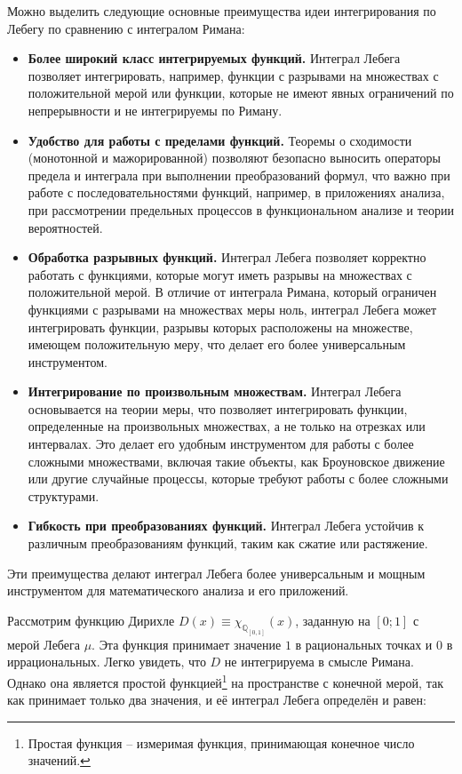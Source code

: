 \documentclass[a4paper,14pt]{extarticle}
\begin{document}
Можно выделить следующие основные преимущества идеи интегрирования по Лебегу по сравнению с интегралом Римана:

\begin{itemize}
    \item \textbf{Более широкий класс интегрируемых функций.} Интеграл Лебега позволяет интегрировать, например, функции с разрывами на множествах с положительной мерой или функции, которые не имеют явных ограничений по непрерывности и не интегрируемы по Риману.
    \item \textbf{Удобство для работы с пределами функций.} Теоремы о сходимости (монотонной и мажорированной) позволяют безопасно выносить операторы предела и интеграла при выполнении преобразований формул, что важно при работе с последовательностями функций, например, в приложениях анализа, при рассмотрении предельных процессов в функциональном анализе и теории вероятностей.
    \item \textbf{Обработка разрывных функций.} Интеграл Лебега позволяет корректно работать с функциями, которые могут иметь разрывы на множествах с положительной мерой. В отличие от интеграла Римана, который ограничен функциями с разрывами на множествах меры ноль, интеграл Лебега может интегрировать функции, разрывы которых расположены на множестве, имеющем положительную меру, что делает его более универсальным инструментом.
    \item \textbf{Интегрирование по произвольным множествам.} Интеграл Лебега основывается на теории меры, что позволяет интегрировать функции, определенные на произвольных множествах, а не только на отрезках или интервалах. Это делает его удобным инструментом для работы с более сложными множествами, включая такие объекты, как Броуновское движение или другие случайные процессы, которые требуют работы с более сложными структурами.
    \item \textbf{Гибкость при преобразованиях функций.} Интеграл Лебега устойчив к различным преобразованиям функций, таким как сжатие или растяжение.
\end{itemize}

Эти преимущества делают интеграл Лебега более универсальным и мощным инструментом для математического анализа и его приложений. ~\cite{folland}

Рассмотрим функцию Дирихле $D(x) \equiv \chi_{\mathbb{Q}_{[0,1]}}(x)$, заданную на $[0; 1]$ с мерой Лебега $\mu$. Эта функция принимает значение $1$ в рациональных точках и $0$ в иррациональных. Легко увидеть, что $D$ не интегрируема в смысле Римана. Однако она является простой функцией\footnote{Простая функция -- измеримая функция, принимающая конечное число значений.} на пространстве с конечной мерой, так как принимает только два значения, и её интеграл Лебега определён и равен:
\end{document}
